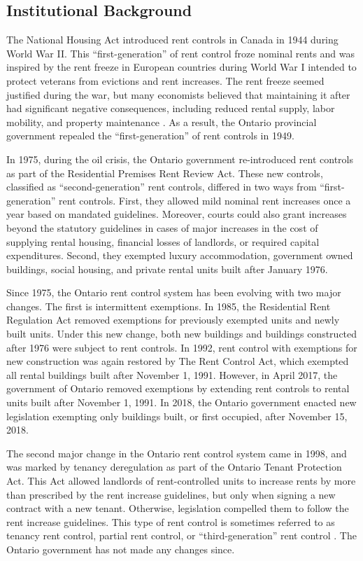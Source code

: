 \documentclass[parskip=full]{article}
\begin{document}
\subsection{Institutional Background}\label{sec:Instituional_background} 

The National Housing Act introduced rent controls in Canada in 1944 during World War II. This “first-generation” of rent control froze nominal rents and was inspired by the rent freeze in European countries during World War I intended to protect veterans from evictions and rent increases. The rent freeze seemed justified during the war, but many economists believed that maintaining it after had significant negative consequences, including reduced rental supply, labor mobility, and property maintenance \citep{arnott-1995}. As a result, the Ontario provincial government repealed the “first-generation” of rent controls in 1949.  

In 1975, during the oil crisis, the Ontario government re-introduced rent controls as part of the Residential Premises Rent Review Act. These new controls, classified as “second-generation” rent controls, differed in two ways from “first-generation” rent controls. First, they allowed mild nominal rent increases once a year based on mandated guidelines. Moreover, courts could also grant increases beyond the statutory guidelines in cases of major increases in the cost of supplying rental housing, financial losses of landlords, or required capital expenditures. Second, they exempted luxury accommodation, government owned buildings, social housing, and private rental units built after January 1976.

Since 1975, the Ontario rent control system has been evolving with two major changes. The first is intermittent exemptions. In 1985, the Residential Rent Regulation Act removed exemptions for previously exempted units and newly built units. Under this new change, both new buildings and buildings constructed after 1976 were subject to rent controls. In 1992, rent control with exemptions for new construction was again restored by The Rent Control Act, which exempted all rental buildings built after November 1, 1991. However, in April 2017, the government of Ontario removed exemptions by extending rent controls to rental units built after November 1, 1991. In 2018, the Ontario government enacted new legislation exempting only buildings built, or first occupied, after November 15, 2018.

The second major change in the Ontario rent control system came in 1998, and was marked by tenancy deregulation as part of the Ontario Tenant Protection Act. This Act allowed landlords of rent-controlled units to increase rents by more than prescribed by the rent increase guidelines, but only when signing a new contract with a new tenant. Otherwise, legislation compelled them to follow the rent increase guidelines. This type of rent control is sometimes referred to as tenancy rent control, partial rent control, or “third-generation” rent control \citep{arnott-2003}. The Ontario government has not made any changes since. 
\end{document}
